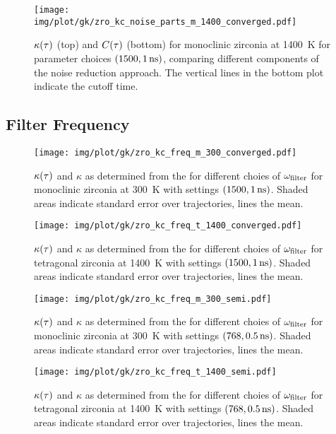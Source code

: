 \clearpage

\begin{figure*}
  \texttt{[image: img/plot/gk/zro\_kc\_noise\_parts\_m\_1400\_converged.pdf]}
  \caption{
  $\kappa(\tau)$ (top) and $C(\tau)$ (bottom) for monoclinic zirconia at \qty{1400}{K} for  parameter choices $(1500, \qty{1}{ns})$, comparing different components of the noise reduction approach.
  The vertical lines in the bottom plot indicate the cutoff time.
  }
  \label{fig:si-gkc_hfacf_noise_comparison_converged_m_1400}
\end{figure*}

\clearpage
\subsection{Filter Frequency}

\begin{figure}
  \texttt{[image: img/plot/gk/zro\_kc\_freq\_m\_300\_converged.pdf]}
  \caption{
  $\kappa(\tau)$ and $\kappa$ as determined from the \hfacf for different choies of $\omega_{\text{filter}}$ 
  for monoclinic zirconia at \qty{300}{K}
  with  settings $(1500, \qty{1}{ns})$.
  Shaded areas indicate standard error over trajectories, lines the mean.
  }
  \label{fig:si-gkc_freq_m_300_converged}
\end{figure}

\begin{figure}
  \texttt{[image: img/plot/gk/zro\_kc\_freq\_t\_1400\_converged.pdf]}
  \caption{
  $\kappa(\tau)$ and $\kappa$ as determined from the \hfacf for different choies of $\omega_{\text{filter}}$ 
  for tetragonal zirconia at \qty{1400}{K}
  with  settings $(1500, \qty{1}{ns})$.
  Shaded areas indicate standard error over trajectories, lines the mean.
  }
  \label{fig:si-gkc_freq_t_1400_converged}
\end{figure}

\clearpage
\begin{figure}
  \texttt{[image: img/plot/gk/zro\_kc\_freq\_m\_300\_semi.pdf]}
  \caption{
  $\kappa(\tau)$ and $\kappa$ as determined from the \hfacf for different choies of $\omega_{\text{filter}}$ 
  for monoclinic zirconia at \qty{300}{K}
  with  settings $(768, \qty{0.5}{ns})$.
  Shaded areas indicate standard error over trajectories, lines the mean.
  }
  \label{fig:si-gkc_freq_m_300_semi}
\end{figure}

\begin{figure}
  \texttt{[image: img/plot/gk/zro\_kc\_freq\_t\_1400\_semi.pdf]}
  \caption{
  $\kappa(\tau)$ and $\kappa$ as determined from the \hfacf for different choies of $\omega_{\text{filter}}$ 
  for tetragonal zirconia at \qty{1400}{K}
  with  settings $(768, \qty{0.5}{ns})$.
  Shaded areas indicate standard error over trajectories, lines the mean.
  }
  \label{fig:si-gkc_freq_t_1400_semi}
\end{figure}

